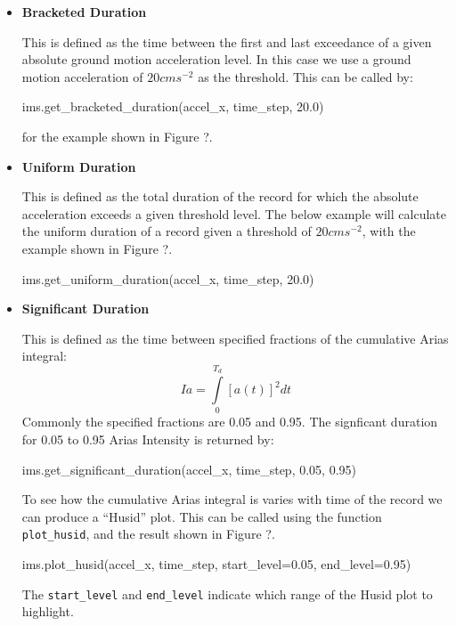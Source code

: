 \begin{itemize}
\item \textbf{Bracketed Duration}

This is defined as the time between the first and last exceedance of a given absolute ground motion acceleration level. In this case we use a ground motion acceleration of $20 cm s^{-2}$ as the threshold. This can be called by:
\begin{python}
ims.get_bracketed_duration(accel_x, time_step, 20.0)
\end{python}

\noindent for the example shown in Figure ?.

\item \textbf{Uniform Duration}

This is defined as the total duration of the record for which the absolute acceleration exceeds a given threshold level. The below example will calculate the uniform duration of a record given a threshold of $20 cm s^{-2}$, with the example shown in Figure ?.

\begin{python}
ims.get_uniform_duration(accel_x, time_step, 20.0)
\end{python}

\item \textbf{Significant Duration}

This is defined as the time between specified fractions of the cumulative Arias integral:
\begin{equation}
Ia = \int\limits_0^{T_d} \left[ {a \left( t \right)}\right]^2 dt
\end{equation}
Commonly the specified fractions are 0.05 and 0.95. The signficant duration for 0.05 to 0.95 Arias Intensity is returned by:

\begin{python}
ims.get_significant_duration(accel_x, time_step,
                             0.05, 0.95)
\end{python}

To see how the cumulative Arias integral is varies with time of the record we can produce a ``Husid'' plot. This can be called using the function \verb=plot_husid=, and the result shown in Figure ?.

\begin{python}
ims.plot_husid(accel_x,
               time_step,
               start_level=0.05,
               end_level=0.95)
\end{python}

The \verb=start_level= and \verb=end_level= indicate which range of the Husid plot to highlight.

\end{itemize}

